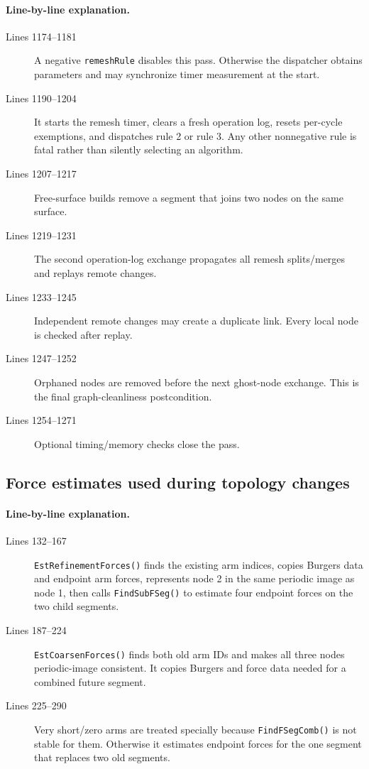 \documentclass[11pt]{article}
\newcommand{\code}[1]{\texorpdfstring{\nolinkurl{#1}}{#1}}
\begin{document}
\paragraph{Line-by-line explanation.}
\begin{description}
\item[Lines 1174--1181] A negative \code{remeshRule} disables this pass.
Otherwise the dispatcher obtains parameters and may synchronize timer
measurement at the start.
\item[Lines 1190--1204] It starts the remesh timer, clears a fresh operation
log, resets per-cycle exemptions, and dispatches rule 2 or rule 3. Any other
nonnegative rule is fatal rather than silently selecting an algorithm.
\item[Lines 1207--1217] Free-surface builds remove a segment that joins two
nodes on the same surface.
\item[Lines 1219--1231] The second operation-log exchange propagates all
remesh splits/merges and replays remote changes.
\item[Lines 1233--1245] Independent remote changes may create a duplicate
link. Every local node is checked after replay.
\item[Lines 1247--1252] Orphaned nodes are removed before the next ghost-node
exchange. This is the final graph-cleanliness postcondition.
\item[Lines 1254--1271] Optional timing/memory checks close the pass.
\end{description}

\subsection{Force estimates used during topology changes}





\paragraph{Line-by-line explanation.}
\begin{description}
\item[Lines 132--167] \code{EstRefinementForces()} finds the existing arm
indices, copies Burgers data and endpoint arm forces, represents node 2 in the
same periodic image as node 1, then calls \code{FindSubFSeg()} to estimate
four endpoint forces on the two child segments.
\item[Lines 187--224] \code{EstCoarsenForces()} finds both old arm IDs and
makes all three nodes periodic-image consistent. It copies Burgers and force
data needed for a combined future segment.
\item[Lines 225--290] Very short/zero arms are treated specially because
\code{FindFSegComb()} is not stable for them. Otherwise it estimates endpoint
forces for the one segment that replaces two old segments.
\end{description}
\end{document}
